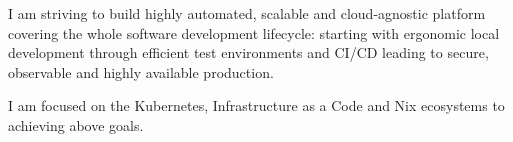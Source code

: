 

\begin{cvparagraph}
    I am striving to build highly automated, scalable and cloud-agnostic platform covering the whole software development lifecycle:
    starting with ergonomic local development through efficient test environments and CI/CD leading to secure, observable and highly available production.

    I am focused on the Kubernetes, Infrastructure as a Code and Nix ecosystems to achieving above goals.
\end{cvparagraph}
